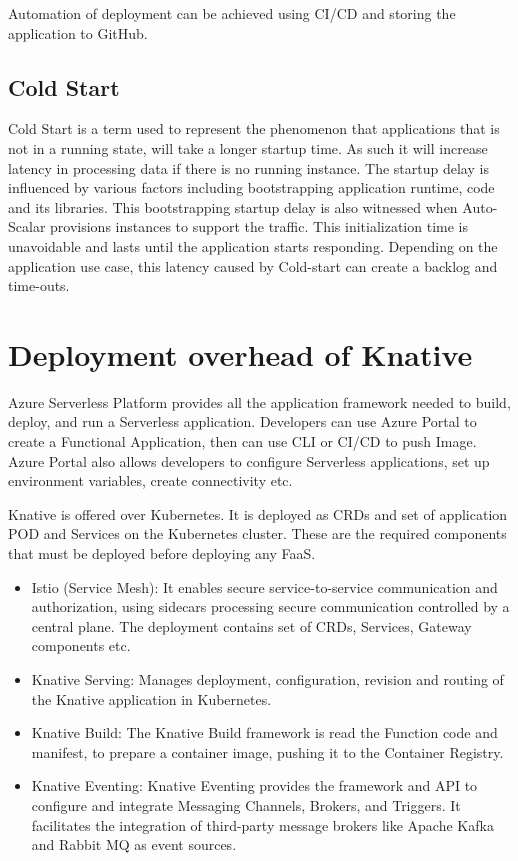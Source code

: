 \documentclass[12pt]{article}
\begin{document}
\begin{flushleft}
Automation of deployment can be achieved using CI/CD and storing the application to GitHub. 

\subsection{Cold Start}
Cold Start is a term used to represent the phenomenon that applications that is not in a running state, will take a longer startup time. As such it will increase latency in processing data if there is no running instance. The startup delay is influenced by various factors including bootstrapping application runtime, code and its libraries. This bootstrapping startup delay is also witnessed when Auto-Scalar provisions instances to support the traffic. This initialization time is unavoidable and lasts until the application starts responding. Depending on the application use case, this latency caused by Cold-start can create a backlog and time-outs.

\section{Deployment overhead of Knative}
Azure Serverless Platform provides all the application framework needed to build, deploy, and run a Serverless application. Developers can use Azure Portal to create a Functional Application, then can use CLI or CI/CD to push Image. Azure Portal also allows developers to configure Serverless applications, set up environment variables, create connectivity etc. 

Knative is offered over Kubernetes. It is deployed as CRDs and set of application POD and Services on the Kubernetes cluster. These are the required components that must be deployed before deploying any FaaS.
\begin{itemize}
    \item Istio (Service Mesh): It enables secure service-to-service communication and authorization, using sidecars processing secure communication controlled by a central plane. 
The deployment contains set of CRDs, Services, Gateway components etc.
    \item Knative Serving:  Manages deployment, configuration, revision and routing of the Knative application in Kubernetes.
    \item Knative Build: The Knative Build framework is read the Function code and manifest, to prepare a container image, pushing it to the Container Registry.
    \item Knative Eventing: Knative Eventing provides the framework and API to configure and integrate Messaging Channels, Brokers, and Triggers. It facilitates the integration of third-party message brokers like Apache Kafka and Rabbit MQ as event sources.
\end{itemize}


\end{flushleft}
\end{document}
